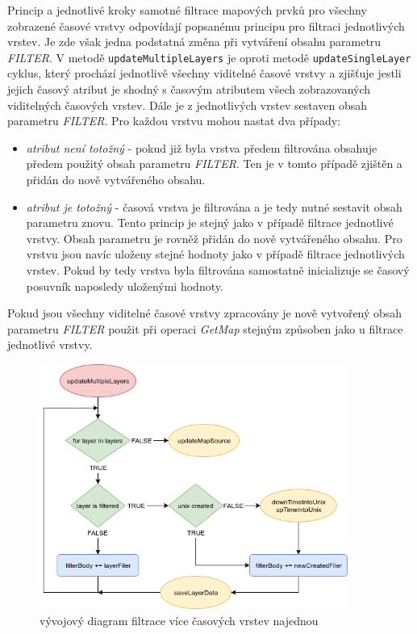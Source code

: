 Princip a jednotlivé kroky samotné filtrace mapových prvků pro všechny zobrazené časové vrstvy odpovídají popsanému principu pro filtraci jednotlivých vrstev. Je zde však jedna podstatná změna při vytváření obsahu parametru \textit{FILTER}. V metodě \verb|updateMultipleLayers| je oproti metodě \verb|updateSingleLayer| cyklus, který prochází jednotlivě všechny viditelné časové vrstvy a zjišťuje jestli jejich časový atribut je shodný s časovým atributem všech zobrazovaných viditelných časových vrstev. Dále je z jednotlivých vrstev sestaven obsah parametru \textit{FILTER}. Pro každou vrstvu mohou nastat dva případy:
	\begin{itemize}
		\item\textit{atribut není totožný} - pokud již byla vrstva předem filtrována obsahuje předem použitý obsah parametru \textit{FILTER}. Ten je v tomto případě zjištěn a přidán do nově vytvářeného obsahu.
		\item\textit{atribut je totožný} - časová vrstva je filtrována a je tedy nutné sestavit obsah parametru znovu. Tento princip je stejný jako v případě filtrace jednotlivé vrstvy. Obsah parametru je rovněž přidán do nově vytvářeného obsahu. Pro vrstvu jsou navíc uloženy stejné hodnoty jako v případě filtrace jednotlivých vrstev. Pokud by tedy vrstva byla filtrována samostatně inicializuje se časový posuvník naposledy uloženými hodnoty. 
	\end{itemize}
Pokud jsou všechny viditelné časové vrstvy zpracovány je nově vytvořený obsah parametru \textit{FILTER} použit při operaci \textit{GetMap} stejným způsoben jako u filtrace jednotlivé vrstvy.

\begin{figure}[h!]
	\centering
	\includegraphics[width=0.9\textwidth]{../img/getMultipleLayers.png}
	\caption{vývojový diagram filtrace více časových vrstev najednou}
	\label{fig:multiple-chart}
\end{figure}

